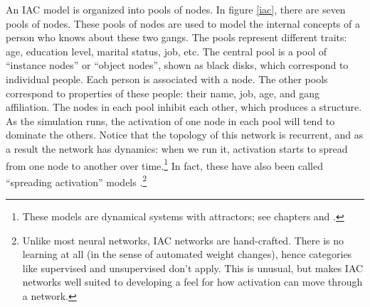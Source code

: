 
An IAC model is organized into pools of nodes. In figure \ref{iac}, there are seven pools of nodes. These pools of nodes are used to model the internal concepts of a person who knows about these two gangs. The pools represent different traits: age, education level, marital status, job, etc. The central pool is a pool of ``instance nodes'' or ``object nodes'', shown as black disks, which correspond to individual people. Each person is associated with a node. The other pools correspond to properties of these people: their name, job, age, and gang affiliation. The nodes in each pool inhibit each other, which produces a  structure. As the simulation runs, the activation of one node in each pool will tend to dominate the others. Notice that the topology of this network is recurrent, and as a result the network has dynamics: when we run it, activation starts to spread from one node to another over time.\footnote{These models are dynamical systems with attractors; see chapters  and .} In fact, these have also been called ``spreading activation'' models \cite{mcclelland1981retrieving, mcnamara2005spreading}.\footnote{Unlike most neural networks, IAC networks are hand-crafted. There is no learning at all (in the sense of automated weight changes), hence categories like supervised and unsupervised don't apply. This is unusual, but makes IAC networks well suited to developing a feel for how activation can move through a network.} 


